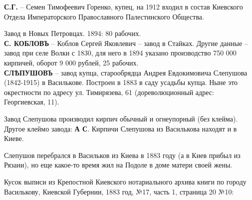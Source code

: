 \noindent\textbf{С.Г.} – Семен Тимофеевич Горенко, купец, на 1912 входил в состав Киевского Отдела Императорского Православного Палестинского Общества.

Завод в Новых Петровцах. 1894: 80 рабочих.\\

\noindent\textbf{С. КОБЛОВЪ} – Коблов Сергей Яковлевич – завод в Стайках. Другие данные – завод при селе Волки с 1830, для него в 1894 указано производство 750 000 кирпичей, оборот 9 000 рублей, 25 рабочих.\\

\noindent\textbf{СЛѢПУШОВЪ} – завод купца, старообрядца Андрея Евдокимовича Слепушова (1842-1915) в Василькове. Построен в 1883 в саду усадьбы купца. Ныне это окрестности по адресу ул. Тимирязева, 61 (дореволюционный адрес: Георгиевская, 11). 

Завод Слепушова производил кирпич обычный и огнеупорный (без клейма). Другое клеймо завода: \textbf{А С}. Кирпичи Слепушова из Василькова находят и в Киеве.

Слепушов перебрался в Васильков из Киева в 1883 году (а в Киев прибыл из Рязани), но еще какое-то время жил на Подоле в доме матери своей жены.

Кусок выписи из Крепостной Киевского нотариального архива книги по городу Василькову, Киевской Губернии, 1883 год, №17, часть 1, страница 20 №10: 

